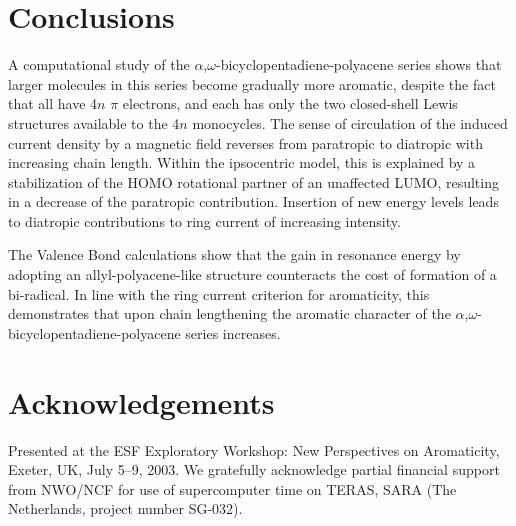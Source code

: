 \section{Conclusions}

A computational study of the $\alpha$,$\omega$-bicyclopentadiene-polyacene series shows that larger molecules in this series become gradually more aromatic, despite the fact that all have 4$n$ $\pi$ electrons, and each has only the two closed-shell Lewis structures available to the 4$n$ monocycles. The sense of circulation of the induced current density by a magnetic field reverses from paratropic to diatropic with increasing chain length. Within the ipsocentric model, this is explained by a stabilization of the HOMO rotational partner of an unaffected LUMO, resulting in a decrease of the paratropic contribution. Insertion of new energy levels leads to diatropic contributions to ring current of increasing intensity.

The Valence Bond calculations show that the gain in resonance energy by adopting an allyl-polyacene-like structure counteracts the cost of formation of a bi-radical. In line with the ring current criterion for aromaticity, this demonstrates that upon chain lengthening the aromatic character of the $\alpha$,$\omega$-bicyclopentadiene-polyacene series increases.

\section*{Acknowledgements}

Presented at the ESF Exploratory Workshop: New Perspectives on Aromaticity, Exeter, UK, July 5--9, 2003. We gratefully acknowledge partial financial support from NWO/NCF for use of supercomputer time on TERAS, SARA (The Netherlands, project number \mbox{SG-032}).



